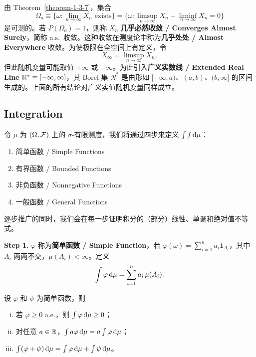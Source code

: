 由 Theorem~\ref{theorem-1-3-7}，集合
\[
    \Omega_o \equiv \{\omega : \lim_{n \to \infty} X_n \text{ exists}\} = \{\omega : \limsup_{n \to \infty} X_n - \liminf_{n \to \infty} X_n = 0\}
\]
是可测的。若 $P(\Omega_o) = 1$，则称 $X_n$ {\normalfont\bfseries 几乎必然收敛 / Converges Almost Surely}，简称 a.s.\ 收敛。这种收敛在测度论中称为{\normalfont\bfseries 几乎处处 / Almost Everywhere} 收敛。为使极限在全空间上有定义，令
\[
    X_\infty = \limsup_{n \to \infty} X_n,
\]
但此随机变量可能取值 $+\infty$ 或 $-\infty$。为此引入{\normalfont\bfseries 广义实数线 / Extended Real Line} $\mathbb{R}^* \equiv [-\infty,\infty]$，其 Borel 集 $\mathcal{R}^*$ 是由形如 $[-\infty,a)$、$(a,b)$、$(b,\infty]$ 的区间生成的。上面的所有结论对广义实值随机变量同样成立。

\clearpage

\subsection{Integration}

令 $\mu$ 为 $(\Omega, \mathcal{F})$ 上的 $\sigma$-有限测度，我们将通过四步来定义 $\int f \,\mathrm{d}\mu$：
\begin{enumerate}
    \item 简单函数 / Simple Functions
    \item 有界函数 / Bounded Functions
    \item 非负函数 / Nonnegative Functions
    \item 一般函数 / General Functions
\end{enumerate}
逐步推广的同时，我们会在每一步证明积分的（部分）线性、单调和绝对值不等式。

\medskip\noindent\textbf{Step 1.} $\varphi$ 称为{\normalfont\bfseries 简单函数 / Simple Function}，若 $\varphi(\omega) = \sum_{i=1}^n a_i \mathbf{1}_{A_i}$，其中 $A_i$ 两两不交，$\mu(A_i) < \infty$。定义
\[
    \int \varphi \,\mathrm{d}\mu = \sum_{i=1}^n a_i \, \mu(A_i).
\]

\begin{lemma}\label{lemma-1-4-1}
    设 $\varphi$ 和 $\psi$ 为简单函数，则
    \begin{enumerate}[(i)]
        \item 若 $\varphi \ge 0$ a.e.，则 $\int \varphi \,\mathrm{d}\mu \ge 0$；
        \item 对任意 $a \in \mathbb{R}$，$\int a\varphi \,\mathrm{d}\mu = a\int \varphi \,\mathrm{d}\mu$；
        \item $\int (\varphi + \psi) \,\mathrm{d}\mu = \int \varphi \,\mathrm{d}\mu + \int \psi \,\mathrm{d}\mu$。
    \end{enumerate}
\end{lemma}

